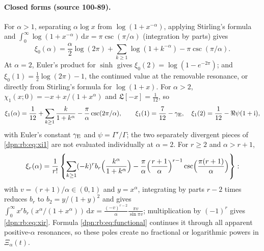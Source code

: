 \documentclass[11pt]{article}
\numberwithin{equation}{section}
\theoremstyle{definition}\newtheorem{definition}[theorem]{Definition}
\theoremstyle{remark}\newtheorem{remark}[theorem]{Remark}
\newcommand{\dd}{\,\mathrm d}\newcommand{\ii}{\mathrm i}
\newcommand{\src}[1]{\textup{(source #1)}}
\begin{document}
\paragraph{Closed forms \src{100-89}.}
For $\alpha>1$, separating $\alpha\log x$ from $\log(1+x^{-\alpha})$, applying
Stirling's formula and $\int_0^\infty\log(1+x^{-\alpha})\dd x=\pi\csc(\pi/\alpha)$
(integration by parts) gives
\begin{equation}\label{dpn:rb:eq:xi0}
 \xi_0(\alpha)=\frac\alpha2\log(2\pi)+\sum_{k\ge1}\log(1+k^{-\alpha})
                         -\pi\csc(\pi/\alpha).
\end{equation}
At $\alpha=2$, Euler's product for $\sinh$ gives $\xi_0(2)=\log(1-e^{-2\pi})$;
and $\xi_0(1)=\frac12\log(2\pi)-1$, the continued value at the removable
resonance, or directly from Stirling's formula for $\log(1+x)$.  For
$\alpha>2$, $\chi_1(x;0)=-x+x/(1+x^\alpha)$ and $\mathfrak L[-x]=\frac1{12}$, so
\begin{equation}\label{dpn:rb:eq:xi1}
 \xi_1(\alpha)=\frac1{12}+\sum_{k\ge1}\frac{k}{1+k^\alpha}
                       -\frac\pi\alpha\csc(2\pi/\alpha),\qquad
 \xi_1(1)=\frac7{12}-\gamma_{\rm E},\quad
 \xi_1(2)=\frac1{12}-\Re\psi(1+\ii),
\end{equation}
with Euler's constant $\gamma_{\rm E}$ and $\psi=\Gamma'/\Gamma$; the two
separately divergent pieces of \eqref{dpn:rb:eq:xi1} are not evaluated
individually at $\alpha=2$.  For $r\ge2$ and $\alpha>r+1$,
\begin{equation}\label{dpn:rb:eq:xir}
 \xi_r(\alpha)=\frac1{r!}\left\{
 \sum_{k\ge1}(-k)^rb_r\Bigl(\frac{k^\alpha}{1+k^\alpha}\Bigr)
 -\frac\pi\alpha\Bigl(\frac{r+1}{\alpha}\Bigr)^{r-1}
       \csc\Bigl(\frac{\pi(r+1)}\alpha\Bigr)\right\}:
\end{equation}
with $v=(r+1)/\alpha\in(0,1)$ and $y=x^\alpha$, integrating by parts $r-2$
times reduces $b_r$ to $b_2=y/(1+y)^2$ and gives
$\int_0^\infty x^rb_r(x^\alpha/(1+x^\alpha))\dd x
=\frac{(-v)^{r-2}}\alpha\frac{\pi v}{\sin\pi v}$; multiplication by $(-1)^r$
gives \eqref{dpn:rb:eq:xir}.  Formula \eqref{dpn:rb:eq:functional} continues it
through all apparent positive-$\alpha$ resonances, so these poles create no
fractional or logarithmic powers in $\Xi_\alpha(t)$.
\end{document}
